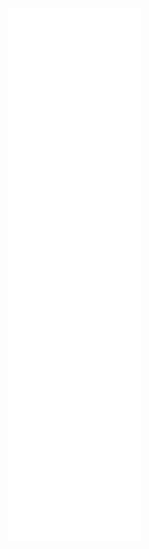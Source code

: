 \begin{figure}[H]
\begin{center}
\leavevmode
\includegraphics[height=400pt]{classRegisterStateHandler__coll__graph}
\end{center}
\end{figure}
